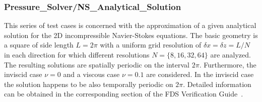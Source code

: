 \subsubsection{Pressure\_Solver/NS\_Analytical\_Solution}

This series of test cases is concerned with the approximation of a given analytical solution for the 2D incompressible Navier-Stokes equations. 
%
The basic geometry is a square of side length $L=2\pi$ with a uniform grid resolution of $\delta x = \delta z = L/N$ in each direction for which different resolutions $N =\{8,16,32,64\}$ are analyzed.  The resulting solutions are spatially periodic on the interval $2\pi$. Furthermore, the inviscid case $\nu=0$ and a viscous case $\nu=0.1$ are considered. In the inviscid case the solution happens to be also temporally periodic on $2\pi$.
Detailed information can be obtained in the corresponding section of the FDS Verification Guide~\cite{McGrattan:2018:VG}.

